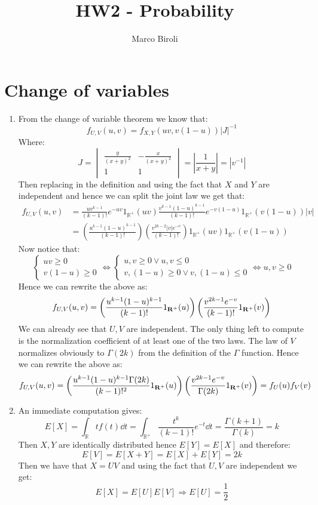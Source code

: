 \documentclass[10pt,a4paper]{article}
\author{Marco Biroli}
\title{HW2 - Probability}
\begin{document}
\maketitle

\section{Change of variables}
\begin{enumerate}

\item From the change of variable theorem we know that:
\[
f_{U, V}(u, v) = f_{X, Y}(uv, v(1 - u)) |J|^{-1}
\]
Where:
\[
J = \begin{vmatrix}
\frac{y}{(x+y)^2} & -\frac{x}{(x+y)^2}\\
1 & 1
\end{vmatrix} = \left|\frac{1}{x+y}\right| =  |v^{-1}|
\]
Then replacing in the definition and using the fact that $X$ and $Y$ are independent and hence we can split the joint law we get that:
\begin{align*}
f_{U,V}(u, v) &= \frac{uv^{k-1}}{(k-1)!} e^{-uv} 1_{\mathbb{R}^+}(uv) \frac{v^{k-1}(1 - u)^{k-1}}{(k - 1)!} e^{-v(1- u)} 1_{\mathbb{R}^+} (v(1 - u)) |v|\\
&= \left( \frac{u^{k-1} (1 - u)^{k-1}}{(k-1)!} \right)\left( \frac{v^{2k - 2} |v| e^{-v}}{(k-1)!} \right) 1_{\mathbb{R}^+}(uv) 1_{\mathbb{R}^+}(v(1 - u))
\end{align*}
Now notice that:
\[
\begin{cases}
uv \geq 0\\
v(1 - u) \geq 0
\end{cases}
\Leftrightarrow
\begin{cases}
u, v \geq 0 \lor u, v \leq 0\\
v, (1 - u) \geq 0 \lor v, (1 - u) \leq 0
\end{cases}
\Leftrightarrow
u, v \geq 0
\]
Hence we can rewrite the above as:
\[
f_{U,V}(u, v) = \left( \frac{u^{k-1} (1 - u)^{k-1}}{(k-1)!} 1_{\vb{R}^+}(u) \right)\left( \frac{v^{2k - 1}e^{-v}}{(k-1)!} 1_{\vb{R}^+}(v) \right)
\]
We can already see that $U, V$ are independent. The only thing left to compute is the normalization coefficient of at least one of the two laws. The law of $V$ normalizes obviously to $\Gamma(2k)$ from the definition of the $\Gamma$ function. Hence we can rewrite the above as:
\[
f_{U,V}(u, v) = \left( \frac{u^{k-1} (1 - u)^{k-1} \Gamma(2k)}{(k-1)!^2} 1_{\vb{R}^+}(u) \right)\left( \frac{v^{2k - 1}e^{-v}}{\Gamma(2k)} 1_{\vb{R}^+}(v) \right) = f_U(u) f_V(v)
\]

\item An immediate computation gives:
\[
E[X] = \int_\mathbb{R} t f(t) \dd t = \int_{\mathbb{R}^+} \frac{t^k}{(k-1)!} e^{-t} \dd t = \frac{\Gamma(k+1)}{\Gamma(k)} = k 
\]
Then $X, Y$ are identically distributed hence $E[Y] = E[X]$ and therefore:
\[
E[V] = E[X+Y] = E[X] + E[Y] = 2k
\]
Then we have that $X = UV$ and using the fact that $U, V$ are independent we get:
\[
E[X] = E[U]E[V] \Rightarrow E[U] = \frac{1}{2}
\]

\end{enumerate}
\end{document}
